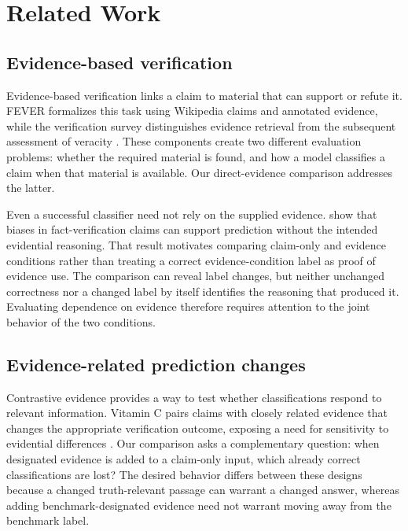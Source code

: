 \documentclass[11pt,letterpaper]{article}
\begin{document}
\section{Related Work}\label{sec:related}
\subsection{Evidence-based verification}
Evidence-based verification links a claim to material that can support or refute it. FEVER formalizes this task using Wikipedia claims and annotated evidence, while the verification survey distinguishes evidence retrieval from the subsequent assessment of veracity \citep{thorne-etal-2018-fever,guo-etal-2022-survey}. These components create two different evaluation problems: whether the required material is found, and how a model classifies a claim when that material is available. Our direct-evidence comparison addresses the latter.

Even a successful classifier need not rely on the supplied evidence. \citet{schuster-etal-2019-towards} show that biases in fact-verification claims can support prediction without the intended evidential reasoning. That result motivates comparing claim-only and evidence conditions rather than treating a correct evidence-condition label as proof of evidence use. The comparison can reveal label changes, but neither unchanged correctness nor a changed label by itself identifies the reasoning that produced it. Evaluating dependence on evidence therefore requires attention to the joint behavior of the two conditions.

\subsection{Evidence-related prediction changes}
Contrastive evidence provides a way to test whether classifications respond to relevant information. Vitamin C pairs claims with closely related evidence that changes the appropriate verification outcome, exposing a need for sensitivity to evidential differences \citep{schuster-etal-2021-get}. Our comparison asks a complementary question: when designated evidence is added to a claim-only input, which already correct classifications are lost? The desired behavior differs between these designs because a changed truth-relevant passage can warrant a changed answer, whereas adding benchmark-designated evidence need not warrant moving away from the benchmark label.
\end{document}
